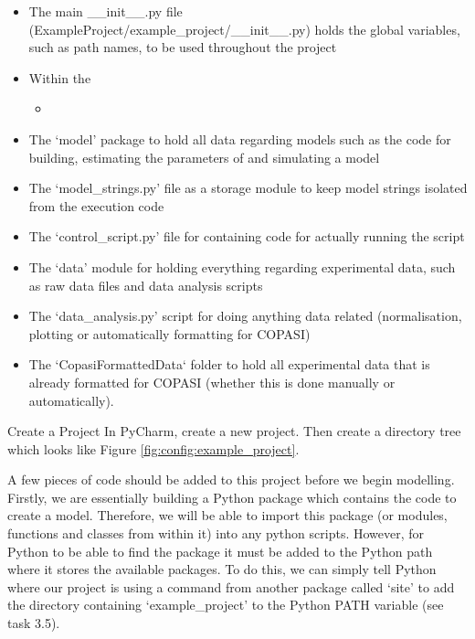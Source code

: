 \documentclass[../main]{subfiles}
\begin{document}
\begin{itemize}
\item The main \_\_init\_\_.py file (ExampleProject/example\_project/\_\_init\_\_.py) holds the global variables, such as path names, to be used throughout the project
\item Within the
\begin{itemize}
\item {}
\end{itemize}
\item The `model' package to hold all data regarding models such as the code for building, estimating the parameters of and simulating a model
\item The `model\_strings.py' file as a storage module to keep model strings isolated from the execution code
\item The `control\_script.py' file for containing code for actually running the script
\item The `data' module for holding everything regarding experimental data, such as raw data files and data analysis scripts
\item The `data\_analysis.py' script for doing anything data related (normalisation, plotting or automatically formatting for COPASI)
\item The `CopasiFormattedData` folder to hold all experimental data that is already formatted for COPASI (whether this is done manually or automatically).
\end{itemize}

\begin{Task}{Create a Project}
In PyCharm, create a new project. Then create a directory tree which looks like Figure \ref{fig:config:example_project}.
\end{Task}

A few pieces of code should be added to this project before we begin modelling. Firstly,
we are essentially building a Python package which contains the code to create a model. Therefore, we will be able to import this package (or modules, functions and classes from within
it) into any python scripts. However, for Python to be able to find the package it must be added to the Python path where it stores the available packages.
To do this, we can simply tell Python where our project is using a command from another package called `site' to add the directory
containing `example\_project' to the Python PATH variable (see task 3.5).

\end{document}
